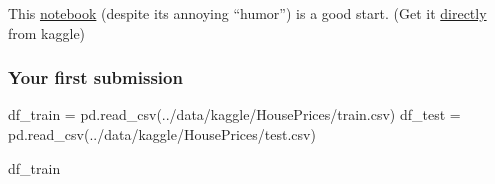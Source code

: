 \documentclass[
  letterpaper,
  DIV=11,
  numbers=noendperiod]{scrreprt}
\newenvironment{Shaded}{\begin{snugshade}}{\end{snugshade}}
\newcommand{\NormalTok}[1]{\textcolor[rgb]{0.00,0.23,0.31}{#1}}
\newcommand{\OperatorTok}[1]{\textcolor[rgb]{0.37,0.37,0.37}{#1}}
\newcommand{\StringTok}[1]{\textcolor[rgb]{0.13,0.47,0.30}{#1}}
\begin{document}
This \href{../data/kaggle/HousePrices/EDA.ipynb}{notebook} (despite its
annoying ``humor'') is a good start. (Get it
\href{https://www.kaggle.com/pmarcelino/comprehensive-data-exploration-with-python}{directly}
from kaggle)

\hypertarget{your-first-submission}{%
\subsubsection{Your first submission}\label{your-first-submission}}

\begin{Shaded}
\begin{Highlighting}[]
\NormalTok{df\_train }\OperatorTok{=}\NormalTok{ pd.read\_csv(}\StringTok{\textquotesingle{}../data/kaggle/HousePrices/train.csv\textquotesingle{}}\NormalTok{)}
\NormalTok{df\_test }\OperatorTok{=}\NormalTok{ pd.read\_csv(}\StringTok{\textquotesingle{}../data/kaggle/HousePrices/test.csv\textquotesingle{}}\NormalTok{)}
\end{Highlighting}
\end{Shaded}

\begin{Shaded}
\begin{Highlighting}[]
\NormalTok{df\_train}
\end{Highlighting}
\end{Shaded}
\end{document}
